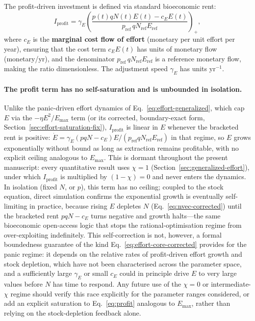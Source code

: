 \documentclass[twocolumn,10pt]{article}
\begin{document}
The profit-driven investment is defined via standard bioeconomic rent:
\begin{equation}
I_{\text{profit}} = \gamma_E \left( \frac{p(t) q N(t) E(t) - c_E E(t)}{p_{\text{ref}} \, q N_{\text{ref}} E_{\text{ref}}} \right)_+,
\label{eq:profit}
\end{equation}
where \(c_E\) is the \textbf{marginal cost flow of effort} (monetary per unit effort per year), ensuring that the cost term \(c_E E(t)\) has units of monetary flow (monetary/yr), and the denominator \(p_{\text{ref}} \, q N_{\text{ref}} E_{\text{ref}}\) is a reference monetary flow, making the ratio dimensionless. The adjustment speed \(\gamma_E\) has units yr\(^{-1}\).

\paragraph{The profit term has no self-saturation and is unbounded in isolation.} Unlike the panic-driven effort dynamics of Eq.~\eqref{eq:effort-generalized}, which cap $E$ via the $-\eta E^2/E_{\max}$ term (or its corrected, boundary-exact form, Section~\ref{sec:effort-saturation-fix}), $I_{\text{profit}}$ is linear in $E$ whenever the bracketed rent is positive: $\dot E=\gamma_E(pqN-c_E)E/(p_{\text{ref}}qN_{\text{ref}}E_{\text{ref}})$ in that regime, so $E$ grows exponentially without bound as long as extraction remains profitable, with no explicit ceiling analogous to $E_{\max}$. This is dormant throughout the present manuscript: every quantitative result uses $\chi=1$ (Section~\ref{sec:generalized-effort}), under which $I_{\text{profit}}$ is multiplied by $(1-\chi)=0$ and never enters the dynamics. In isolation (fixed $N$, or $p$), this term has no ceiling; coupled to the stock equation, direct simulation confirms the exponential growth is eventually self-limiting in practice, because rising $E$ depletes $N$ (Eq.~\eqref{eq:nvec-corrected}) until the bracketed rent $pqN-c_E$ turns negative and growth halts---the same bioeconomic open-access logic that stops the rational-optimisation regime from over-exploiting indefinitely. This self-correction is not, however, a formal boundedness guarantee of the kind Eq.~\eqref{eq:effort-core-corrected} provides for the panic regime: it depends on the relative rates of profit-driven effort growth and stock depletion, which have not been characterised across the parameter space, and a sufficiently large $\gamma_E$ or small $c_E$ could in principle drive $E$ to very large values before $N$ has time to respond. Any future use of the $\chi=0$ or intermediate-$\chi$ regime should verify this race explicitly for the parameter ranges considered, or add an explicit saturation to Eq.~\eqref{eq:profit} analogous to $E_{\max}$, rather than relying on the stock-depletion feedback alone.
\end{document}
